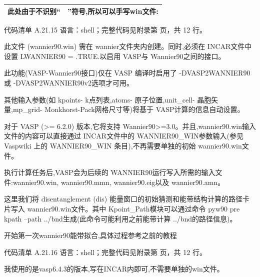 \documentclass[lang=cn,scheme=chinese,color=blue,device=normal,toc=onecol,math=cm]{elegantbook}
\begin{document}
\begin{center}\small
\begin{longtable}{@{}p{} p{}@{}}
\toprule
此处由于不识别“ & ”符号,所以可以手写win文件: \\
\midrule
\bottomrule
\end{longtable}
\end{center}


\begin{codeindexbox}{代码清单 A.21.15}
语言：shell；完整代码见附录第 \pageref{code:21:15} 页，共 12 行。
\end{codeindexbox}


此文件 (wannier90.win) 需在 wannier文件夹内创建。同时,必须在 INCAR文件中设置 LWANNIER90 = .TRUE.以启用 VASP与 Wannier90之间的接口。\par


此功能(VASP-Wannier90接口)仅在 VASP 编译时启用了 -DVASP2WANNIER90或 -DVASP2WANNIER90v2选项才可用。\par


其他输入参数(如 kpoints- k点列表,atoms- 原子位置,unit\_\allowbreak{}cell- 晶胞矢量,mp\_\allowbreak{}grid- Monkhorst-Pack网格尺寸等)将基于 VASP计算的信息自动设置。\par


对于 VASP (>= 6.2.0) 版本,它将支持 Wannier90>=3.0。并且,wannier90.win输入文件的内容可以直接通过 INCAR文件中的 WANNIER90\_\allowbreak{}WIN参数输入(参见 Vaspwiki 上的 WANNIER90\_\allowbreak{}WIN 条目),不再需要单独的初始 wannier90.win文件。\par


执行计算任务后,VASP会为后续的 WANNIER90运行写入所需的输入文件:wannier90.win, wannier90.mmn, wannier90.eig以及 wannier90.amn。\par


这里我们将 disentanglement (dis) 能量窗口的初始猜测和能带结构计算的路径卡片写入 wannier90.win文件。其中 Kpoint\_\allowbreak{}Path模块可以通过命令 pyw90 pre kpath –path ../\allowbreak{}bnd生成(此命令可能利用之前能带计算 ../\allowbreak{}bnd的路径信息)。\par


开始第一次wannier90能带拟合,具体过程参考之前的教程\par


\begin{codeindexbox}{代码清单 A.21.16}
语言：shell；完整代码见附录第 \pageref{code:21:16} 页，共 12 行。
\end{codeindexbox}


我使用的是vasp6.4.3的版本,写在INCAR内即可,不需要单独的win文件。\par
\end{document}
